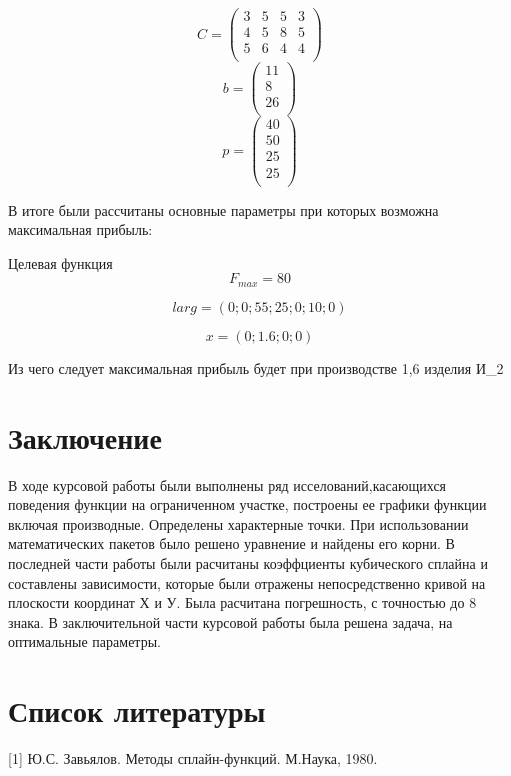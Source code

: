 \documentclass[russian,utf8,nocolumnxxxi,nocolumnxxxii]{eskdtext}
\begin{document}
\begin{equation}
C = \begin{pmatrix}
3 & 5 & 5 & 3 \\
4 & 5 & 8 & 5 \\         
5 & 6 & 4 & 4 \\
\end{pmatrix}
\end{equation}
\begin{equation}
b = \begin{pmatrix}
11  \\
8  \\         
26  \\
\end{pmatrix}
\end{equation}
\begin{equation}
p = \begin{pmatrix}
40 \\
50 \\         
25 \\
25 \\
\end{pmatrix}
\end{equation}

В итоге были рассчитаны основные параметры при которых возможна максимальная прибыль:

Целевая функция $$F_{max}=80$$

$$larg=(0;0;55;25;0;10;0)$$

$$x=(0;1.6;0;0)$$

Из чего следует максимальная прибыль будет при производстве 1,6 изделия И_2
\clearpage
\newpage
\section{Заключение}
В ходе курсовой работы были выполнены ряд исселований,касающихся поведения функции на ограниченном участке, построены ее графики функции включая производные. Определены характерные точки.
При использовании математических пакетов было решено уравнение и найдены его корни.
В последней части работы были расчитаны коэффциенты кубического сплайна и составлены зависимости, которые были отражены непосредственно кривой на плоскости координат Х и У. Была расчитана погрешность, с точностью до 8 знака.
В заключительной части курсовой работы была решена задача, на оптимальные параметры.
\clearpage
\section{Список литературы}
[1] Ю.С. Завьялов. Методы сплайн-функций. М.Наука, 1980.
\end{document}
